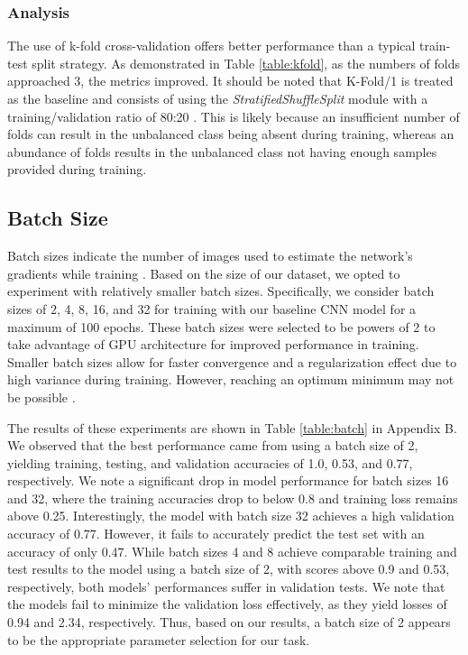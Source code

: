 \documentclass{article}
\begin{document}
\subsubsection{Analysis}
The use of k-fold cross-validation offers better performance than a typical train-test split strategy. As demonstrated in Table \ref{table:kfold}, as the numbers of folds approached 3, the metrics improved. It should be noted that K-Fold/1 is treated as the baseline and consists of using the \emph{StratifiedShuffleSplit} module with a training/validation ratio of 80:20 \cite{scikit-learn}. This is likely because an insufficient number of folds can result in the unbalanced class being absent during training, whereas an abundance of folds results in the unbalanced class not having enough samples provided during training.


\subsection{Batch Size}
Batch sizes indicate the number of images used to estimate the network’s gradients while training \cite{KANDEL2020312}. Based on the size of our dataset, we opted to experiment with relatively smaller batch sizes. Specifically, we consider batch sizes of 2, 4, 8, 16, and 32 for training with our baseline CNN model for a maximum of 100 epochs. These batch sizes were selected to be powers of 2 to take advantage of GPU architecture for improved performance in training. Smaller batch sizes allow for faster convergence and a regularization effect due to high variance during training. However, reaching an optimum minimum may not be possible \cite{KANDEL2020312}. 

The results of these experiments are shown in Table \ref{table:batch} in Appendix B. We observed that the best performance came from using a batch size of 2, yielding training, testing, and validation accuracies of 1.0, 0.53, and 0.77, respectively. We note a significant drop in model performance for batch sizes 16 and 32, where the training accuracies drop to below 0.8 and training loss remains above 0.25. Interestingly, the model with batch size 32 achieves a high validation accuracy of 0.77. However, it fails to accurately predict the test set with an accuracy of only 0.47. While batch sizes 4 and 8 achieve comparable training and test results to the model using a batch size of 2, with scores above 0.9 and 0.53, respectively, both models' performances suffer in validation tests. We note that the models fail to minimize the validation loss effectively, as they yield losses of 0.94 and 2.34, respectively. Thus, based on our results, a batch size of 2 appears to be the appropriate parameter selection for our task.
\end{document}
